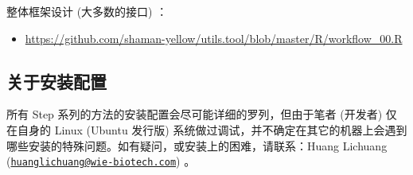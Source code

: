 \documentclass[
]{article}
\providecommand{\tightlist}{%
  \setlength{\itemsep}{0pt}\setlength{\parskip}{0pt}}
\begin{document}
整体框架设计 (大多数的接口) ：

\begin{itemize}
\tightlist
\item
  \url{https://github.com/shaman-yellow/utils.tool/blob/master/R/workflow_00.R}
\end{itemize}

\hypertarget{ux5173ux4e8eux5b89ux88c5ux914dux7f6e}{%
\subsection{关于安装配置}\label{ux5173ux4e8eux5b89ux88c5ux914dux7f6e}}

所有 Step 系列的方法的安装配置会尽可能详细的罗列，但由于笔者 (开发者) 仅在自身的 Linux (Ubuntu 发行版) 系统做过调试，并不确定在其它的机器上会遇到哪些安装的特殊问题。如有疑问，或安装上的困难，请联系：Huang Lichuang (\href{mailto:huanglichuang@wie-biotech.com}{\nolinkurl{huanglichuang@wie-biotech.com}}) 。
\end{document}
